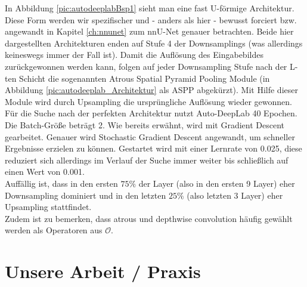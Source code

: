 In Abbildung \ref{pic:autodeeplabBsp1} sieht man eine fast U-förmige Architektur. Diese Form werden wir spezifischer und - anders als hier - bewusst forciert bzw. angewandt in Kapitel \ref{ch:nnunet} zum nnU-Net genauer betrachten. Beide hier dargestellten Architekturen enden auf Stufe 4 der Downsamplings (was allerdings keineswegs immer der Fall ist). Damit die Auflösung des Eingabebildes zurückgewonnen werden kann, folgen auf jeder Downsampling Stufe nach der L-ten Schicht die sogenannten Atrous Spatial Pyramid Pooling Module (in Abbildung \ref{pic:autodeeplab_Architektur} als ASPP abgekürzt). Mit Hilfe dieser Module wird durch Upsampling die ursprüngliche Auflösung wieder gewonnen.\\[0.3cm]
Für die Suche nach der perfekten Architektur nutzt Auto-DeepLab 40 Epochen. Die Batch-Größe beträgt 2. Wie bereits erwähnt, wird mit Gradient Descent gearbeitet. Genauer wird Stochastic Gradient Descent angewandt, um schneller Ergebnisse erzielen zu können. Gestartet wird mit einer Lernrate von 0.025, diese reduziert sich allerdings im Verlauf der Suche immer weiter bis schließlich auf einen Wert von 0.001.\\
Auffällig ist, dass in den ersten $75\%$ der Layer (also in den ersten 9 Layer) eher Downsampling dominiert und in den letzten $25\%$ (also letzten 3 Layer) eher Upsampling stattfindet.\\
Zudem ist zu bemerken, dass atrous und depthwise convolution häufig gewählt werden als Operatoren aus $\mathcal{O}$.



\section{Unsere Arbeit / Praxis}

